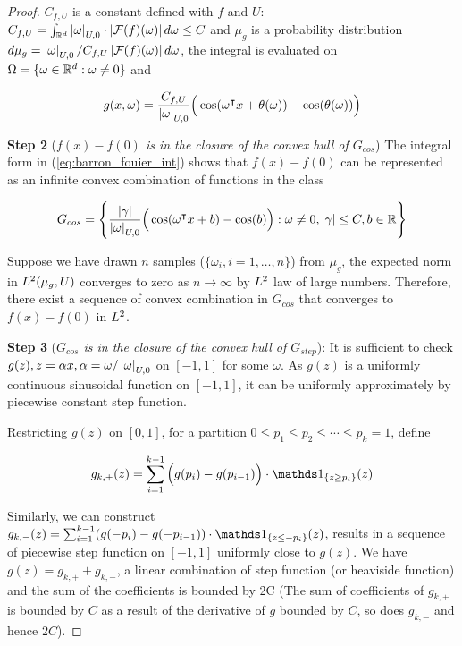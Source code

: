 \begin{proof}
    $C_{f,U}$ is a constant defined with $f$ and $U$: $C_{f,U} =
        \int_{\mathbb{R}^d} \left| \omega \right|_{U, 0} \cdot \left| \mathcal{F}(f)(\omega) \right| d\omega \leq
        C$ and $\mu_g$ is a probability distribution $d\mu_g =
        \left| \omega \right|_{U,0}/C_{f,U}\left| \mathcal{F}(f)(\omega) \right| d\omega$, the integral is
    evaluated on $\Omega = \{\omega \in \mathbb{R}^d: \omega \not = 0\}$ and

    \begin{equation}
        g(x, \omega) = \frac{C_{f,U}}{\left| \omega \right|_{U, 0}}\Big(\cos(\omega{}^{\intercal} x + \theta(\omega)) - \cos(\theta(\omega))\Big)
    \end{equation}

    \textbf{Step 2} (\textit{$f(x) - f(0)$ is in the closure of the convex hull
        of $G_{cos}$}) The integral form in (\ref{eq:barron_fouier_int}) shows that
    $f(x) - f(0)$ can be represented as an infinite convex combination of
    functions in the class

    \begin{equation}
        G_{cos} = \Bigg\{\frac{\left| \gamma \right|}{\left| \omega \right|_{U, 0}}\Big(\cos(\omega{}^{\intercal} x + b) - \cos(b)\Big): \omega \not= 0, \left| \gamma \right| \leq C, b \in \mathbb{R} \Bigg\}
    \end{equation}

    Suppose we have drawn $n$ samples ($\{\omega_i, i = 1,\dots, n\}$) from
    $\mu_g$, the expected norm in $L^{2}(\mu_g, U)$ converges to zero as $n \to
    \infty$ by $L^{2}$ law of large numbers. Therefore, there exist a sequence
    of convex combination in $G_{cos}$ that converges to $f(x) - f(0)$ in
    $L^{2}$.


    \textbf{Step 3} (\textit{$G_{cos}$ is in the closure of the convex hull of
        $G_{step}$}): It is sufficient to check $g(z), z = \alpha x, \alpha =
        \omega/\left| \omega \right|_{U,0}$ on $[-1, 1]$ for some $\omega$. As $g(z)$ is a
    uniformly continuous sinusoidal function on $[-1, 1]$, it can be uniformly
    approximately by piecewise constant step function.

    Restricting $g(z)$ on $[0, 1]$, for a partition ${0 \leq p_1 \leq p_2 \leq
                \cdots \leq p_k = 1}$, define

    \begin{align}
        g_{k,+}(z) = \sum_{i=1}^{k-1} \Big(g(p_i) - g(p_{i-1})\Big) \cdot
        \indicator{\{z\geq p_i\}}(z)
    \end{align}

    Similarly, we can construct $g_{k,-}(z) = \sum_{i=1}^{k-1} (g(-p_i) -
    g(-p_{i-1})) \cdot \indicator{\{z\leq -p_i\}}(z)$, results in a sequence of
    piecewise step function on $[-1, 1]$ uniformly close to $g(z)$. We have
    $g(z) = g_{k,+}+g_{k,-}$, a linear combination of step function (or
    heaviside function) and the sum of the coefficients is bounded by 2C (The
    sum of coefficients of $g_{k,+}$ is bounded by $C$ as a result of the
    derivative of $g$ bounded by $C$, so does $g_{k,-}$ and hence $2C$).


\end{proof}
